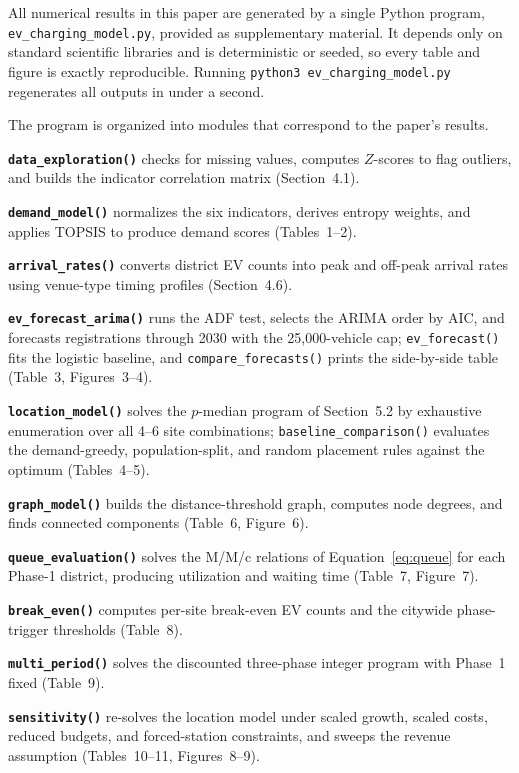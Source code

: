 \documentclass[11pt]{article}
\begin{document}
All numerical results in this paper are generated by a single Python program, \texttt{ev\_charging\_model.py}, provided as supplementary material. It depends only on standard scientific libraries and is deterministic or seeded, so every table and figure is exactly reproducible. Running \texttt{python3 ev\_charging\_model.py} regenerates all outputs in under a second.

The program is organized into modules that correspond to the paper's results.

\textbf{\texttt{data\_exploration()}} checks for missing values, computes $Z$-scores to flag outliers, and builds the indicator correlation matrix (Section~4.1).

\textbf{\texttt{demand\_model()}} normalizes the six indicators, derives entropy weights, and applies TOPSIS to produce demand scores (Tables~1--2).

\textbf{\texttt{arrival\_rates()}} converts district EV counts into peak and off-peak arrival rates using venue-type timing profiles (Section~4.6).

\textbf{\texttt{ev\_forecast\_arima()}} runs the ADF test, selects the ARIMA order by AIC, and forecasts registrations through 2030 with the 25{,}000-vehicle cap; \texttt{ev\_forecast()} fits the logistic baseline, and \texttt{compare\_forecasts()} prints the side-by-side table (Table~3, Figures~3--4).

\textbf{\texttt{location\_model()}} solves the $p$-median program of Section~5.2 by exhaustive enumeration over all 4--6 site combinations; \texttt{baseline\_comparison()} evaluates the demand-greedy, population-split, and random placement rules against the optimum (Tables~4--5).

\textbf{\texttt{graph\_model()}} builds the distance-threshold graph, computes node degrees, and finds connected components (Table~6, Figure~6).

\textbf{\texttt{queue\_evaluation()}} solves the M/M/c relations of Equation~\eqref{eq:queue} for each Phase-1 district, producing utilization and waiting time (Table~7, Figure~7).

\textbf{\texttt{break\_even()}} computes per-site break-even EV counts and the citywide phase-trigger thresholds (Table~8).

\textbf{\texttt{multi\_period()}} solves the discounted three-phase integer program with Phase~1 fixed (Table~9).

\textbf{\texttt{sensitivity()}} re-solves the location model under scaled growth, scaled costs, reduced budgets, and forced-station constraints, and sweeps the revenue assumption (Tables~10--11, Figures~8--9).
\end{document}
